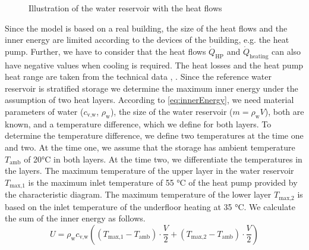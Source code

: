     \begin{figure}[H]
        \centering
        \def\svgwidth{120pt}
        
        \caption{Illustration of the water reservoir with the heat flows}
        \label{fig:Figure of the water reservoir with the heat flows}
    \end{figure}
    Since the model is based on a real building, the size of the heat flows and the inner energy are limited according to the devices of the building, e.g. the heat pump. Further, we have to consider that the heat flows $\dot{Q}_\text{HP}$ and $\dot{Q}_\text{heating}$ can also have negative values when cooling is required. The heat losses and the heat pump heat range are taken from the technical data \cite{Oskar}, \cite{TUM}.\newline
    Since the reference water reservoir is stratified storage we determine the maximum inner energy under the assumption of two heat layers. According to \autoref{eq:innerEnergy}, we need material parameters of water ($c_\text{v,w}$, $\rho_\text{w}$), the size of the water reservoir ($m = \rho_\text{w} V$), both are known, and a temperature difference, which we define for both layers. To determine the temperature difference, we define two temperatures at the time one and two. At the time one, we assume that the storage has ambient temperature $T_\text{amb}$ of 20°C in both layers. At the time two, we differentiate the temperatures in the layers. The maximum temperature of the upper layer in the water reservoir $T_\text{max,1}$ is the maximum inlet temperature of 55 °C of the heat pump provided by the characteristic diagram. The maximum temperature of the lower layer $T_\text{max,2}$ is based on the inlet temperature of the underfloor heating at 35 °C. We calculate the sum of the inner energy as follows. 
    \begin{equation}
        \label{eq:max.Energie}
        U = \rho_\text{w} c_\text{v,w} ((T_\text{max,1}-T_\text{amb})\cdot \frac{V}{2} + (T_\text{max,2}-T_\text{amb})\cdot \frac{V}{2}) 
    \end{equation}

